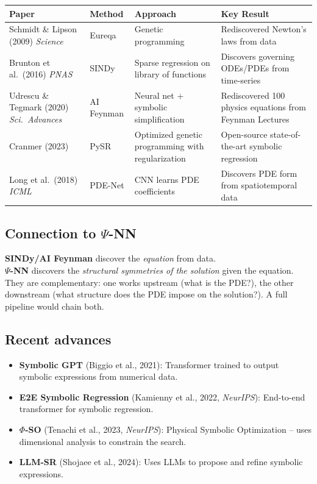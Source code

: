 \documentclass[11pt,a4paper]{article}
\begin{document}
\begin{center}
\renewcommand{\arraystretch}{1.3}
\begin{tabular}{@{}p{3.5cm} p{3cm} p{3cm} p{3cm}@{}}
\toprule
\textbf{Paper} & \textbf{Method} & \textbf{Approach} & \textbf{Key Result} \\
\midrule
Schmidt \& Lipson (2009) \textit{Science} & Eureqa & Genetic programming & Rediscovered Newton's laws from data \\
\addlinespace
Brunton et al.\ (2016) \textit{PNAS} & SINDy & Sparse regression on library of functions & Discovers governing ODEs/PDEs from time-series \\
\addlinespace
Udrescu \& Tegmark (2020) \textit{Sci.\ Advances} & AI Feynman & Neural net + symbolic simplification & Rediscovered 100 physics equations from Feynman Lectures \\
\addlinespace
Cranmer (2023) & PySR & Optimized genetic programming with regularization & Open-source state-of-the-art symbolic regression \\
\addlinespace
Long et al.\ (2018) \textit{ICML} & PDE-Net & CNN learns PDE coefficients & Discovers PDE form from spatiotemporal data \\
\bottomrule
\end{tabular}
\end{center}

\subsection{Connection to $\Psi$-NN}

\begin{tcolorbox}[colback=symbolic!5,colframe=symbolic!70!black]
\small
\textbf{SINDy/AI Feynman} discover the \emph{equation} from data.\\
\textbf{$\Psi$-NN} discovers the \emph{structural symmetries of the solution} given the equation.\\[3pt]
They are complementary: one works upstream (what is the PDE?), the other downstream (what structure does the PDE impose on the solution?). A full pipeline would chain both.
\end{tcolorbox}

\subsection{Recent advances}

\begin{itemize}[leftmargin=1.8em,itemsep=2pt]
\item \textbf{Symbolic GPT} (Biggio et al., 2021): Transformer trained to output symbolic expressions from numerical data.
\item \textbf{E2E Symbolic Regression} (Kamienny et al., 2022, \textit{NeurIPS}): End-to-end transformer for symbolic regression.
\item \textbf{$\Phi$-SO} (Tenachi et al., 2023, \textit{NeurIPS}): Physical Symbolic Optimization -- uses dimensional analysis to constrain the search.
\item \textbf{LLM-SR} (Shojaee et al., 2024): Uses LLMs to propose and refine symbolic expressions.
\end{itemize}
\end{document}
